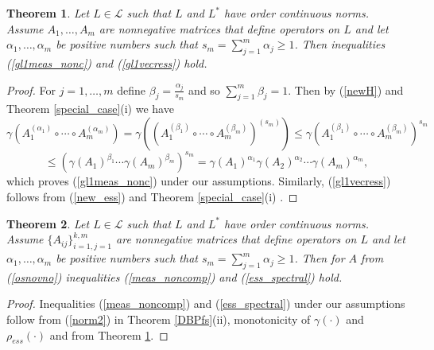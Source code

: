 \documentclass[12pt, reqno]{amsart}
\newtheorem{theorem}{Theorem}[section]
\theoremstyle{definition}
\theoremstyle{remark}
\numberwithin{equation}{section}
\begin{document}

\begin{theorem}
\label{special_case_ess}
Let $L\in \mathcal{L}$ such that %
$L$ and $L^*$ have order continuous norms. 
Assume $A_1, \ldots , A_m$ are  nonnegative matrices that define operators on $L$ and let $\alpha _1, \ldots, \alpha _m$ be positive numbers  such that $s_m= \sum_{j=1}^{m} \alpha _j\ge 1$. Then inequalities
(\ref{gl1meas_nonc}) and (\ref{gl1vecress}) hold.
\end{theorem}
\begin{proof} For $j=1,  \ldots , m$ define $\beta _j = \frac{\alpha _j}{s_m}$ and so $\sum_{j=1}^{m} \beta _j =1$. Then by (\ref{newH}) and Theorem \ref{special_case}(i) we have
$$\gamma (A_1 ^{( \alpha _1)}  \circ \cdots \circ A_m ^{(\alpha _m)} )= \gamma \left( \left(A_1 ^{( \beta _1)} \circ \cdots \circ A_m ^{(\beta _m)} \right)^{(s_m)}\right)
\le  \gamma  \left(A_1 ^{( \beta _1)} \circ  \cdots \circ A_m ^{(\beta _m)} \right)^{s_m}$$
$$\le  \left(\gamma(A_1)^{ \beta _1} \cdots \gamma(A_m)^{\beta _m}\right)^{s_m}= \gamma(A_1)^{ \alpha _1}  \gamma(A_2)^{\alpha _2} \cdots \gamma(A_m)^{\alpha _m},$$
which proves (\ref{gl1meas_nonc}) under our assumptions. Similarly, (\ref{gl1vecress}) follows from (\ref{new_ess}) and  Theorem \ref{special_case}(i) .
\end{proof}
\begin{theorem}
\label{thbegin_ess}
Let $L\in \mathcal{L}$ such that %
$L$ and $L^*$ have order continuous norms. 
Assume $\{A_{i j}\}_{i=1, j=1}^{k, m}$ are  nonnegative matrices that define operators on $L$ and let $\alpha _1, \ldots, \alpha _m$ be positive numbers  such that $s_m= \sum_{j=1}^{m} \alpha _j\ge 1$. Then
for $A$ from (\ref{osnovno}) inequalities
(\ref{meas_noncomp}) and (\ref{ess_spectral}) hold.
\end{theorem}
\begin{proof} Inequalities (\ref{meas_noncomp}) and (\ref{ess_spectral}) under our assumptions follow from (\ref{norm2}) in Theorem \ref{DBPfs}(ii), monotonicity of $\gamma (\cdot)$ and $\rho_{ess} (\cdot)$ and from Theorem \ref{special_case_ess}.
\end{proof}

\end{document}
